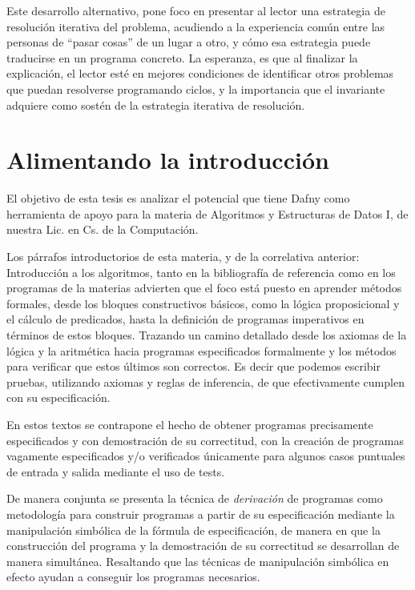 \documentclass[12pt, a4paper, openany, fleqn]{book}
\begin{document}
    Este desarrollo alternativo, pone foco en presentar al lector una estrategia de resolución iterativa del problema, acudiendo a la experiencia común entre las personas de ``pasar cosas'' de un lugar a otro, y cómo esa estrategia puede traducirse en un programa concreto.
    La esperanza, es que al finalizar la explicación, el lector esté en mejores condiciones de identificar otros problemas que puedan resolverse programando ciclos, y la importancia que el invariante adquiere como sostén de la estrategia iterativa de resolución.


    \chapter{Alimentando la introducción}
    El objetivo de esta tesis es analizar el potencial que tiene Dafny como herramienta de apoyo para la materia de Algoritmos y Estructuras de Datos I, de nuestra Lic. en Cs. de la Computación.

    Los párrafos introductorios de esta materia, y de la correlativa anterior: Introducción a los algoritmos, tanto en la bibliografía de referencia como en los programas de la materias advierten que el foco está puesto en aprender métodos formales, desde los bloques constructivos básicos, como la lógica proposicional y el cálculo de predicados, hasta la definición de programas imperativos en términos de estos bloques. Trazando un camino detallado desde los axiomas de la lógica y la aritmética hacia programas especificados formalmente y los métodos para verificar que estos últimos son correctos. Es decir que podemos escribir pruebas, utilizando axiomas y reglas de inferencia, de que efectivamente cumplen con su especificación.

    En estos textos se contrapone el hecho de obtener programas precisamente especificados y con demostración de su correctitud, con la creación de programas vagamente especificados y/o verificados únicamente para algunos casos puntuales de entrada y salida mediante el uso de tests.

    De manera conjunta se presenta la técnica de \textit{derivación} de programas como metodología para construir programas a partir de su especificación mediante la manipulación simbólica de la fórmula de especificación, de manera en que la construcción del programa y la demostración de su correctitud se desarrollan de manera simultánea. Resaltando que las técnicas de manipulación simbólica en efecto ayudan a conseguir los programas necesarios.
\end{document}
